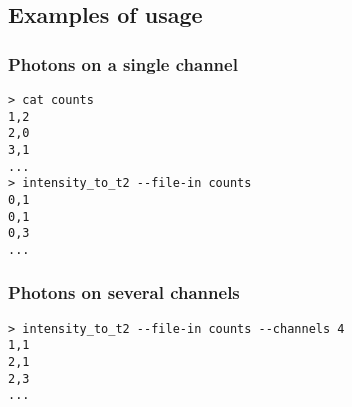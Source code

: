 \subsection{Examples of usage}
\subsubsection{Photons on a single channel}
\begin{verbatim}
> cat counts
1,2
2,0
3,1
...
> intensity_to_t2 --file-in counts
0,1
0,1
0,3
...
\end{verbatim}

\subsubsection{Photons on several channels}
\begin{verbatim}
> intensity_to_t2 --file-in counts --channels 4
1,1
2,1
2,3
...
\end{verbatim}